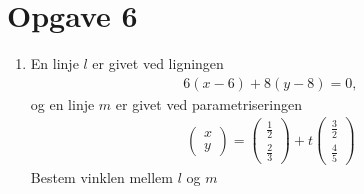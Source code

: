 \section*{Opgave 6}
\begin{enumerate}[label=\roman*)]
	\item En linje $l$ er givet ved ligningen
	\begin{align*}
		6(x-6) + 8(y-8) = 0,
	\end{align*}
	og en linje $m$ er givet ved parametriseringen
	\begin{align*}
		\begin{pmatrix}
			x \\ y
		\end{pmatrix} = 
		\begin{pmatrix}
			\frac{1}{2} \\ \frac{2}{3}
		\end{pmatrix} + t
		\begin{pmatrix}
			\frac{3}{2} \\ \frac{4}{5}
		\end{pmatrix}
	\end{align*}
	Bestem vinklen mellem $l$ og $m$
\end{enumerate}
